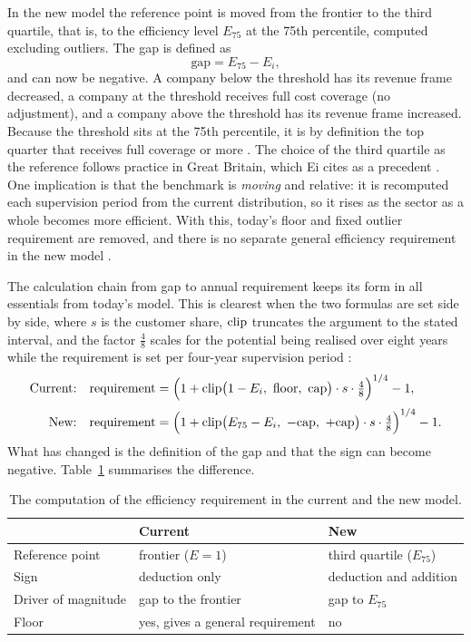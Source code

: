In the new model the reference point is moved from the frontier to the third quartile, that is, to
the efficiency level $E_{75}$ at the 75th percentile, computed excluding outliers. The gap is
defined as
\[
  \text{gap} = E_{75} - E_i,
\]
and can now be negative. A company below the threshold has its revenue frame decreased,
a company at the threshold receives full cost coverage (no adjustment), and a company above the threshold has its
revenue frame increased.
Because the threshold sits at the 75th percentile, it is by definition the top quarter that
receives full coverage or more \citep{Ei2026Effektivisering}. The choice of the third quartile as
the reference follows practice in Great Britain, which Ei cites as
a precedent \citep{Ei2026Effektivisering}. One implication is that the benchmark is \emph{moving}
and relative: it is recomputed each supervision period from the current distribution, so it rises
as the sector as a whole becomes
more efficient. With this, today's floor and fixed outlier requirement are removed, and there is no
separate general efficiency requirement in the new model \citep[][]{Ei2026Effektivisering}.

The calculation chain from gap to annual requirement keeps its form in all essentials from today's
model. This is clearest when the two formulas are set side by side, where $s$ is the customer
share, $\operatorname{clip}$ truncates the argument to the stated interval, and the factor $\tfrac{4}{8}$ scales for
the potential being realised over eight years while the requirement is set per four-year
supervision period \citep[][]{Ei2026Effektivisering}:
\begin{align*}
  \text{Current:} \quad
    & \text{requirement} = \Bigl(1 + \clip\bigl(1 - E_i,\ \text{floor},\ \text{cap}\bigr)
      \cdot s \cdot \tfrac{4}{8}\Bigr)^{1/4} - 1, \\[2pt]
  \text{New:} \quad
    & \text{requirement} = \Bigl(1 + \clip\bigl(E_{75} - E_i,\ -\text{cap},\ +\text{cap}\bigr)
      \cdot s \cdot \tfrac{4}{8}\Bigr)^{1/4} - 1.
\end{align*}
What has changed is the definition of the gap and that the sign can become negative.
Table~\ref{tab:req} summarises the difference.

\begin{table}[h]
  \centering
  \caption{The computation of the efficiency requirement in the current and the new model.}
  \label{tab:req}
  \begin{tabular}{lll}
    \toprule
                          & Current                    & New \\
    \midrule
    Reference point       & frontier ($E = 1$)         & third quartile ($E_{75}$) \\
    Sign                  & deduction only             & deduction and addition \\
    Driver of magnitude   & gap to the frontier        & gap to $E_{75}$ \\
    Floor                 & yes, gives a general requirement & no \\
    \bottomrule
  \end{tabular}
\end{table}

